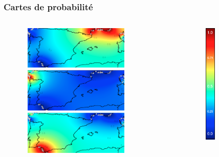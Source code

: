 \documentclass[10pt,xcolor=table]{beamer}\usepackage[]{graphicx}\usepackage[]{color}
\begin{document}
\begin{frame}
	\frametitle{Cartes de probabilité}
	\begin{columns}
	\begin{column}{0.5\textwidth}
	\begin{figure}
		\begin{center}
		\hspace*{2cm}~\includegraphics[width=5cm]{mno}\\[0.5cm]
		\hspace*{2cm}~\includegraphics[width=5cm]{galice}\\[0.5cm]
		\hspace*{2cm}~\includegraphics[width=5cm]{gib}
		\end{center}
	\end{figure}
	\end{column}
	\begin{column}{0.5\textwidth}
		\begin{figure}
			\begin{center}
			\hspace*{2cm}~\includegraphics[width=0.5cm]{scale}
			\end{center}
		\end{figure}
		\end{column}
	\end{columns}
\end{frame}
\end{document}
